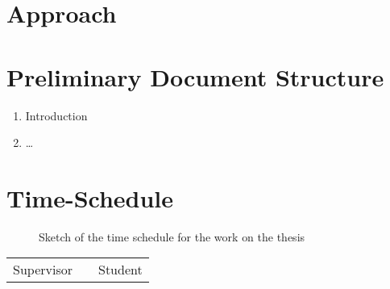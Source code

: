 \documentclass[12pt]{scrartcl}
\begin{document}
\section{Approach}%
\label{sec:approach}

\section{Preliminary Document Structure}%
\label{sec:doc-structure}

\begin{enumerate}
	\item Introduction
	\item \dots
\end{enumerate}

\section{Time-Schedule}%
\label{sec:schedule}

\begin{figure}[!ht]
	\centering
	\caption{Sketch of the time schedule for the work on the thesis}\label{fig:schedule}
\end{figure}

\newpage
{%
\renewcommand{\bibfont}{\normalfont\small}
\setlength{\biblabelsep}{5pt}
\setlength{\bibitemsep}{0.5\baselineskip plus 0.5\baselineskip} %
\setcounter{biburllcpenalty}{9000}
\setcounter{biburlucpenalty}{9999}
\printbibliography%
}

\vspace{6cm}

\begin{center}
	\begin{tabular}{l p{} r}
		\cline{1-1} \cline{3-3}
		\begin{minipage}[t]{0.4\textwidth}
			\centering
			\vspace{0cm}Supervisor
		\end{minipage}
		&
		\begin{minipage}[t]{0.2\textwidth}
		\end{minipage}
		&
		\begin{minipage}[t]{0.4\textwidth}
			\centering
			\vspace{0cm}Student
		\end{minipage}
	\end{tabular}
\end{center}
\end{document}
